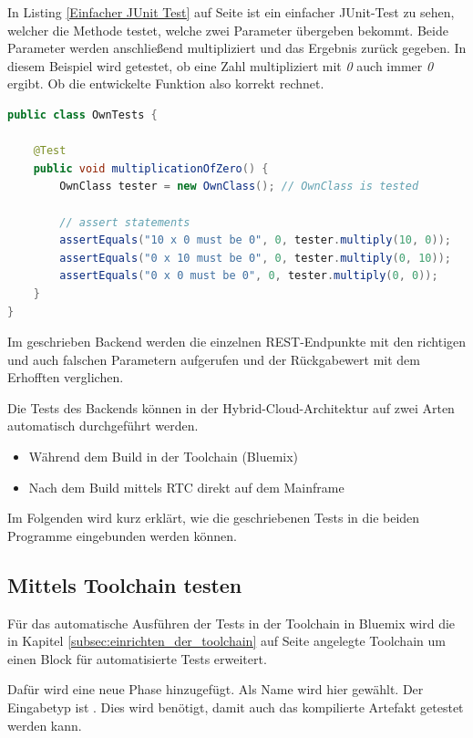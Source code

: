 In Listing \ref{Einfacher JUnit Test} auf Seite \pageref{Einfacher JUnit Test} ist ein einfacher JUnit-Test zu sehen,
welcher die Methode  testet, welche zwei Parameter übergeben bekommt. Beide Parameter werden anschließend
multipliziert und das Ergebnis zurück gegeben. In diesem Beispiel wird getestet, ob eine Zahl multipliziert mit \textit{0}
auch immer \textit{0} ergibt. Ob die entwickelte Funktion also korrekt rechnet.

\begin{lstlisting}[language=java, caption=Einfacher JUnit Test, label=Einfacher JUnit Test]
public class OwnTests {

    @Test
    public void multiplicationOfZero() {
        OwnClass tester = new OwnClass(); // OwnClass is tested

        // assert statements
        assertEquals("10 x 0 must be 0", 0, tester.multiply(10, 0));
        assertEquals("0 x 10 must be 0", 0, tester.multiply(0, 10));
        assertEquals("0 x 0 must be 0", 0, tester.multiply(0, 0));
    }
}
\end{lstlisting}

Im geschrieben Backend werden die einzelnen REST-Endpunkte mit den richtigen und auch falschen Parametern aufgerufen
und der Rückgabewert mit dem Erhofften verglichen.

Die Tests des Backends können in der Hybrid-Cloud-Architektur auf zwei Arten automatisch durchgeführt werden.

\begin{itemize}
    \item Während dem Build in der Toolchain (Bluemix)
    \item Nach dem Build mittels RTC direkt auf dem Mainframe
\end{itemize}

Im Folgenden wird kurz erklärt, wie die geschriebenen Tests in die beiden Programme eingebunden werden können.

\subsection{Mittels Toolchain testen}
Für das automatische Ausführen der Tests in der Toolchain in Bluemix wird die in Kapitel \ref{subsec:einrichten_der_toolchain}
auf Seite \pageref{subsec:einrichten_der_toolchain} angelegte Toolchain um einen Block für automatisierte Tests erweitert.

Dafür wird eine neue Phase hinzugefügt. Als Name wird hier  gewählt. Der Eingabetyp ist
. Dies wird benötigt, damit auch das kompilierte Artefakt getestet werden kann.

